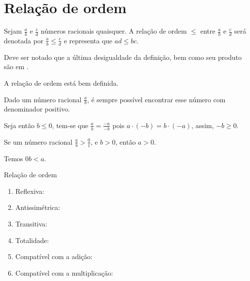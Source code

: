 \documentclass[../main.tex]{subfiles}
\begin{document}
\section{Relação de ordem}
\begin{defi}
    Sejam $\frac{a}{b}$ e $\frac{c}{d}$ números racionais quaisquer. A relação de ordem $\leq$ entre $\frac{a}{b}$ e $\frac{c}{d}$ será denotada por $\frac{a}{b} \leq \frac{c}{d}$ e representa que $ad \leq bc$. 
\end{defi}
\begin{obs}
    Deve ser notado que a última desigualdade da definição, bem como seu produto são em \Z.
\end{obs}
\begin{prop}
    A relação de ordem está bem definida. 
\end{prop}
\begin{prop}
    Dado um número racional $\frac{a}{b}$, é sempre possível encontrar esse número com denominador positivo.
\end{prop}
\begin{dem}
    Seja então $b \leq 0$, tem-se que $\frac{a}{b} = \frac{-a}{-b}$ pois $a \cdot (-b) = b \cdot (-a)$, assim, $-b \geq 0$.
\end{dem}

\begin{prop}
    Se um número racional $\frac{a}{b} > \frac{0}{1}$, e $b > 0$, então $a > 0$.
\end{prop}
\begin{dem}
    Temos $0b < a$.
\end{dem}

\begin{prop}{Relação de ordem}
    \begin{enumerate}[label=(\roman*)]
        \item Reflexiva:
        \item Antissimétrica:
        \item Transitiva:
        \item Totalidade:
        \item Compatível com a adição:
        \item Compatível com a multiplicação:
    \end{enumerate}
\end{prop}
\end{document}
